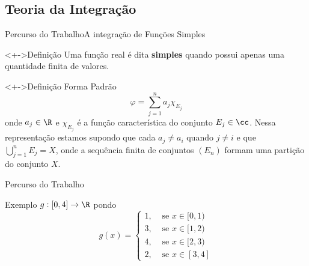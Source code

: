 	\subsection{Teoria da Integração}
	\begin{frame}{Percurso do Trabalho}{A integração de Funções Simples}
		\begin{block}<+->{Definição}
			\justify Uma função real é dita \textbf{simples} quando possui apenas uma quantidade finita de valores.
		\end{block}
	\end{frame}
	\begin{frame}
		\begin{block}<+->{Definição}
			\justify Forma Padrão
			$$
			\varphi =  \sum_{j = 1}^n a_j\chi_{E_j}
			$$
			onde $a_j \in \R$ e $\chi_{E_j}$ é a função característica do conjunto $E_j \in \cc$.
			Nessa representação estamos supondo que cada $a_j \neq a_i$ quando $j \neq i$ e que
			$\displaystyle \bigcup_{j = 1}^n E_j = X$, onde a sequência finita de conjuntos $(E_n)$ formam uma partição do conjunto $X$.
		\end{block}
	\end{frame}
	\begin{frame}{Percurso do Trabalho}
		\begin{block}{Exemplo}
			$g: [0,4] \to \R$ pondo 
			$$g(x) = \left\{
			\begin{array}{cc}
				1, & \textrm{\ se } x \in [0,1) \\
				3, & \textrm{\ se } x \in [1,2) \\
				4, & \textrm{\ se } x \in [2,3) \\
				2, & \textrm{\ se } x \in [3,4]
			\end{array}\right.
			$$
		\end{block}
	\end{frame}

